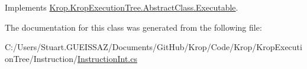 Implements \mbox{\hyperlink{class_krop_1_1_krop_execution_tree_1_1_abstract_class_1_1_executable_ac32692ce44b5f938a90111ee27e7b684}{Krop.\+Krop\+Execution\+Tree.\+Abstract\+Class.\+Executable}}.



The documentation for this class was generated from the following file\+:\begin{DoxyCompactItemize}
\item 
C\+:/\+Users/\+Stuart.\+G\+U\+E\+I\+S\+S\+A\+Z/\+Documents/\+Git\+Hub/\+Krop/\+Code/\+Krop/\+Krop\+Execution\+Tree/\+Instruction/\mbox{\hyperlink{_instruction_int_8cs}{Instruction\+Int.\+cs}}\end{DoxyCompactItemize}
